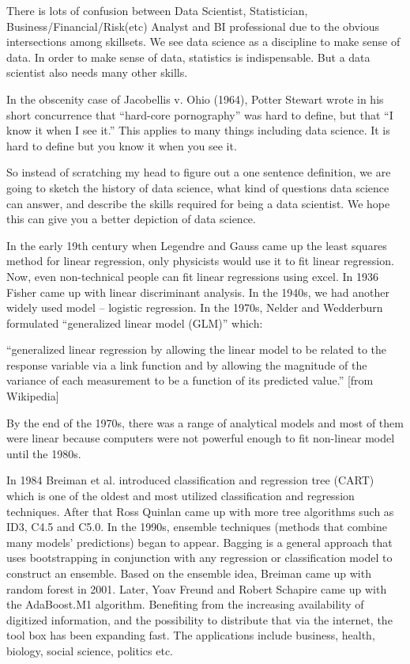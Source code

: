 \documentclass[12pt,]{krantz}
\renewenvironment{quote}{\begin{VF}}{\end{VF}}
\theoremstyle{definition}
\theoremstyle{definition}
\theoremstyle{remark}
\begin{document}
There is lots of confusion between Data Scientist, Statistician,
Business/Financial/Risk(etc) Analyst and BI professional due to the
obvious intersections among skillsets. We see data science as a
discipline to make sense of data. In order to make sense of data,
statistics is indispensable. But a data scientist also needs many other
skills.

In the obscenity case of Jacobellis v. Ohio (1964), Potter Stewart wrote
in his short concurrence that ``hard-core pornography'' was hard to
define, but that ``I know it when I see it.'' This applies to many
things including data science. It is hard to define but you know it when
you see it.

So instead of scratching my head to figure out a one sentence
definition, we are going to sketch the history of data science, what
kind of questions data science can answer, and describe the skills
required for being a data scientist. We hope this can give you a better
depiction of data science.

In the early 19th century when Legendre and Gauss came up the least
squares method for linear regression, only physicists would use it to
fit linear regression. Now, even non-technical people can fit linear
regressions using excel. In 1936 Fisher came up with linear discriminant
analysis. In the 1940s, we had another widely used model -- logistic
regression. In the 1970s, Nelder and Wedderburn formulated ``generalized
linear model (GLM)'' which:

\begin{quote}
``generalized linear regression by allowing the linear model to be
related to the response variable via a link function and by allowing the
magnitude of the variance of each measurement to be a function of its
predicted value.'' {[}from Wikipedia{]}
\end{quote}

By the end of the 1970s, there was a range of analytical models and most
of them were linear because computers were not powerful enough to fit
non-linear model until the 1980s.

In 1984 Breiman et al. introduced classification and regression tree
(CART) which is one of the oldest and most utilized classification and
regression techniques. After that Ross Quinlan came up with more tree
algorithms such as ID3, C4.5 and C5.0. In the 1990s, ensemble techniques
(methods that combine many models' predictions) began to appear. Bagging
is a general approach that uses bootstrapping in conjunction with any
regression or classification model to construct an ensemble. Based on
the ensemble idea, Breiman came up with random forest in 2001. Later,
Yoav Freund and Robert Schapire came up with the AdaBoost.M1 algorithm.
Benefiting from the increasing availability of digitized information,
and the possibility to distribute that via the internet, the tool box
has been expanding fast. The applications include business, health,
biology, social science, politics etc.
\end{document}

